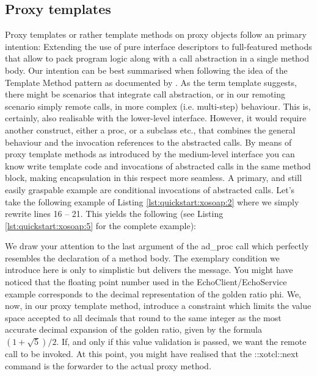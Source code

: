  \subsection{Proxy templates}\label{sec:advanced:template}

Proxy templates or rather template methods on proxy objects follow an primary intention: Extending the use of pure interface descriptors to full-featured methods that allow to pack program logic along with a call abstraction in a single method body. Our intention can be best summarised when following the idea of the Template Method pattern as documented by \cite{gof:1994}. As the term template suggests, there might be scenarios that integrate call abstraction, or in our remoting scenario simply remote calls, in more complex (i.e. multi-step) behaviour. This is, certainly, also realisable with the lower-level interface. However, it would require another construct, either a proc, or a subclass etc., that combines the general behaviour and the invocation references to the abstracted calls. By means of proxy template methods as introduced by the medium-level interface you can know write template code and invocations of abstracted calls in the same method block, making encapsulation in this respect more seamless. A primary, and still easily graspable example are conditional invocations of abstracted calls. Let's take the following example of Listing \ref{lst:quickstart:xosoap:2} where we simply rewrite lines 16 -- 21. This yields the following (see Listing \ref{lst:quickstart:xosoap:5} for the complete example): 



We draw your attention to the last argument of the ad\_proc call which perfectly resembles the declaration of a method body. The exemplary condition we introduce here is only to simplistic but delivers the message. You might have noticed that the floating point number used in the EchoClient/EchoService example corresponds to the decimal representation of the golden ratio phi. We, now, in our proxy template method, introduce a constraint which limits the value space accepted to all decimals that round to the same integer as the most accurate decimal expansion of the golden ratio, given by the formula \begin{math} (1 + \sqrt{5}) / 2\end{math}. If, and only if this value validation is passed, we want the remote call to be invoked. At this point, you might have realised that the ::xotcl::next command is the forwarder to the actual proxy method. 

